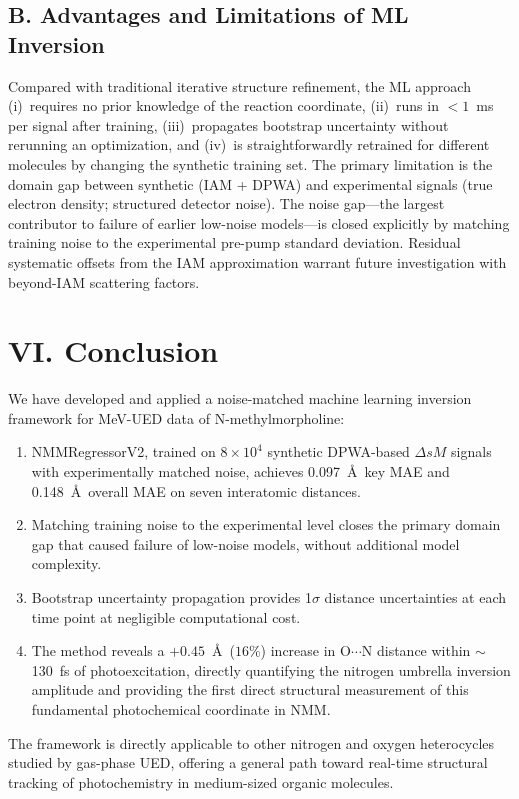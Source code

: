 \documentclass[12pt]{article}
\newcommand{\dsm}{\Delta sM}
\begin{document}
\subsection*{B.\; Advantages and Limitations of ML Inversion}

Compared with traditional iterative structure refinement,\cite{Centurion2022}
the ML approach (i)~requires no prior knowledge of the reaction
coordinate, (ii)~runs in $<1$~ms per signal after training,
(iii)~propagates bootstrap uncertainty without rerunning an
optimization, and (iv)~is straightforwardly retrained for different
molecules by changing the synthetic training set. The primary
limitation is the domain gap between synthetic (IAM + DPWA) and
experimental signals (true electron density; structured detector
noise). The noise gap---the largest contributor to failure of earlier
low-noise models---is closed explicitly by matching training noise to
the experimental pre-pump standard deviation. Residual systematic
offsets from the IAM approximation warrant future investigation with
beyond-IAM scattering factors.\cite{Kirrander2021}

\section*{VI.\; Conclusion}

\noindent
We have developed and applied a noise-matched machine learning
inversion framework for MeV-UED data of N-methylmorpholine:
\begin{enumerate}
  \item NMMRegressorV2, trained on $8\times10^4$ synthetic DPWA-based $\dsm$
    signals with experimentally matched noise, achieves 0.097~\AA\
    key MAE and 0.148~\AA\ overall MAE on seven interatomic distances.
  \item Matching training noise to the experimental level closes the
    primary domain gap that caused failure of low-noise models, without
    additional model complexity.
  \item Bootstrap uncertainty propagation provides 1$\sigma$ distance
    uncertainties at each time point at negligible computational cost.
  \item The method reveals a $+0.45$~\AA\ ($16\%$) increase in
    O$\cdots$N distance within $\sim$130~fs of photoexcitation,
    directly quantifying the nitrogen umbrella inversion amplitude
    and providing the first direct structural measurement of this
    fundamental photochemical coordinate in NMM.
\end{enumerate}
The framework is directly applicable to other nitrogen and oxygen
heterocycles studied by gas-phase UED, offering a general path toward
real-time structural tracking of photochemistry in medium-sized
organic molecules.
\end{document}
